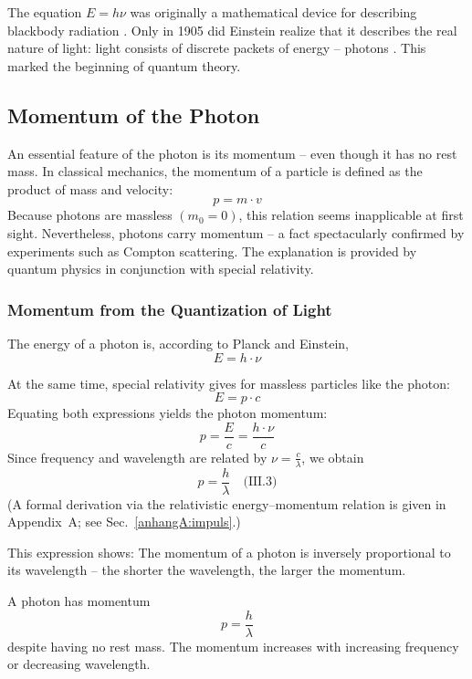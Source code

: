 \begin{tcolorbox}[mathebox,title=Photons as Quanta of Energy]
	\label{box:Photon als Energiequanten}
	The equation $E = h \nu$ was originally a mathematical device for describing blackbody radiation \cite{planck1948}. Only in 1905 did Einstein realize that it describes the real nature of light: light consists of discrete packets of energy – photons \cite{einstein1905}. This marked the beginning of quantum theory.
\end{tcolorbox}

\subsection{Momentum of the Photon}

An essential feature of the photon is its momentum – even though it has no rest mass. In classical mechanics, the momentum of a particle is defined as the product of mass and velocity:
$$
p = m \cdot v
$$
Because photons are massless \((m_0 = 0)\), this relation seems inapplicable at first sight. Nevertheless, photons carry momentum – a fact spectacularly confirmed by experiments such as Compton scattering. The explanation is provided by quantum physics in conjunction with special relativity.

\subsubsection{Momentum from the Quantization of Light}

The energy of a photon is, according to Planck and Einstein,
$$
E = h \cdot \nu
$$

At the same time, special relativity gives for massless particles like the photon:
$$
E = p \cdot c
$$
Equating both expressions yields the photon momentum:
$$
p = \frac{E}{c} = \frac{h \cdot \nu}{c}
$$
Since frequency and wavelength are related by \(\nu = \tfrac{c}{\lambda}\), we obtain
$$
p = \frac{h}{\lambda} \quad \text{(III.3)}
$$
(A formal derivation via the relativistic energy–momentum relation is given in Appendix~A; see Sec.~\ref{anhangA:impuls}.)

This expression shows: The momentum of a photon is inversely proportional to its wavelength – the shorter the wavelength, the larger the momentum.
\vspace{1em}
\begin{tcolorbox}[physikbox,title=Photon Momentum]
	\label{box:Photonenimpuls}
	A photon has momentum
	$$
	p = \frac{h}{\lambda}
	$$
	despite having no rest mass. The momentum increases with increasing frequency or decreasing wavelength.
\end{tcolorbox}

